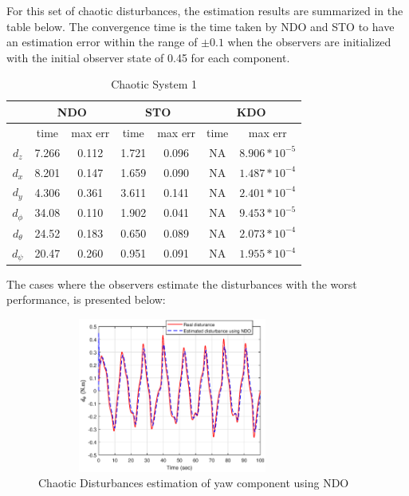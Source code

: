\documentclass[letterpaper%
, twoside%
, 12pt%
,memoire%
, english%
,creativecommons,hyperref%
]{thETS}
\begin{document}
For this set of chaotic disturbances, the estimation results are summarized in the table below. The convergence time is the time taken by NDO and STO to have an estimation error within the range of $\pm0.1$ when the observers are initialized with the initial observer state of 0.45 for each component. 



\begin{table}[!htbp]
\centering
\caption{Chaotic System 1}
\begin{tabular}{*7c}
\toprule
{}  &  \multicolumn{2}{c}{NDO} & \multicolumn{2}{c}{STO} & \multicolumn{2}{c}{KDO}\\
\midrule
{}        &   time & max err  & time  &max err& time  & max err\\
$d_z$     &  7.266 & 0.112   & 1.721  & 0.096 & NA     & $8.906*10^{-5}$\\
$d_x$     &  8.201 & 0.147   & 1.659  & 0.090 & NA     & $1.487*10^{-4}$\\
$d_y$     &  4.306 & 0.361   & 3.611  & 0.141 & NA     & $2.401*10^{-4}$\\
$d_\phi$  &  34.08 & 0.110   & 1.902  & 0.041 & NA     & $9.453*10^{-5}$\\
$d_\theta$&  24.52 & 0.183   & 0.650  & 0.089 & NA     & $2.073*10^{-4}$\\
$d_\psi$  &  20.47 & 0.260   & 0.951  & 0.091 & NA     & $1.955*10^{-4}$\\

\bottomrule
\end{tabular}
\end{table}

The cases where the observers estimate the disturbances with the worst performance, is presented below:

\begin{figure}[H]
\centering
\includegraphics[width=3.5in,height=2in]{Figures/results/chaotic_1_estimates/dis_m1_est_yaw_ndo.eps}
\caption{Chaotic Disturbances estimation of yaw component using NDO}
\label{dis_m1_est_yaw_ndo}
\end{figure}
\end{document}
